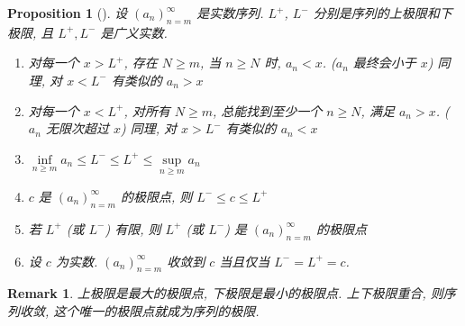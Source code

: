 \documentclass[UTF8]{ctexart}
\theoremstyle{mystyle}
\newtheorem{proposition}{Proposition}[section]
\theoremstyle{myremark}
\newtheorem*{remark}{Remark}
\theoremstyle{plain}
\begin{document}
\begin{proposition}[] \label{limsup}
    设 $ (a_n)_{n = m}^\infty $ 是实数序列. $ L^+ $, $ L^- $ 分别是序列的上极限和下极限, 且 $ L^+, L^- $ 是广义实数.
    \begin{enumerate}
        \item 对每一个 $ x > L^+ $, 存在 $ N \geqslant m $, 当 $ n \geqslant N $ 时, $ a_n < x $. ($ a_n $ 最终会小于 $ x $) 同理, 对 $ x < L^- $ 有类似的 $ a_n > x $
        \item 对每一个 $ x < L^+ $, 对所有 $ N \geqslant m $, 总能找到至少一个 $ n \geqslant N $, 满足 $ a_n > x $. ($ a_n $ 无限次超过 $ x $) 同理, 对 $ x > L^- $ 有类似的 $ a_n < x $
        \item $ \inf\limits_{n \geqslant m} a_n \leqslant L^- \leqslant L^+ \leqslant \sup\limits_{n \geqslant m} a_n $
        \item $ c $ 是 $ (a_n)_{n = m}^\infty $ 的极限点, 则 $ L^- \leqslant c \leqslant L^+ $
        \item 若 $ L^+ $ (或 $ L^- $) 有限, 则 $ L^+ $ (或 $ L^- $) 是 $ (a_n)_{n = m}^\infty $ 的极限点
        \item 设 $ c $ 为实数. $ (a_n)_{n = m}^\infty $ 收敛到 $ c $ 当且仅当 $ L^- = L^+ = c $.
    \end{enumerate}
\end{proposition}

\begin{remark}
    上极限是最大的极限点, 下极限是最小的极限点. 上下极限重合, 则序列收敛, 这个唯一的极限点就成为序列的极限.
\end{remark}
\end{document}
